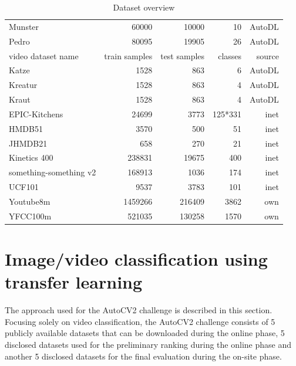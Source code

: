 \documentclass{article}
\begin{document}
\begin{table}
\begin{tabular}{|l|r|r|r|r|}
Munster & 60000 & 10000 & 10 & AutoDL \\
Pedro & 80095 & 19905 & 26 & AutoDL\\
\hline
\hline
video dataset name & train samples & test samples & classes & source \\
\hline
Katze & 1528 & 863 & 6 & AutoDL \\
Kreatur & 1528 & 863 & 4 & AutoDL \\ 
Kraut & 1528 & 863 & 4 & AutoDL \\
EPIC-Kitchens & 24699 & 3773 & 125*331 & inet \\
HMDB51 & 3570 & 500 & 51 & inet \\ 
JHMDB21 & 658 & 270 & 21 & inet \\
Kinetics 400 & 238831 & 19675 & 400 & inet \\
something-something v2 & 168913 & 1036 & 174 & inet \\
UCF101 & 9537 & 3783 & 101 & inet \\
Youtube8m  & 1459266 & 216409 & 3862 & own \\
YFCC100m & 521035 & 130258 & 1570 & own \\
\hline
\end{tabular}
\normalsize
\caption{Dataset overview}
\label{table:datasets}
\end{table}

\section{Image/video classification using transfer learning}
\label{sec:tl}

The approach used for the AutoCV2 challenge is described in this section. Focusing solely on video classification, the AutoCV2 challenge consists of 5 publicly available datasets that can be downloaded during the online phase, 5 disclosed datasets used for the preliminary ranking during the online phase and another 5 disclosed datasets for the final evaluation during the on-site phase. 
\end{document}
